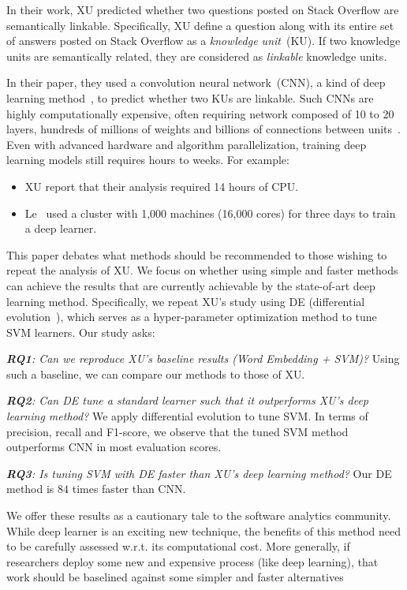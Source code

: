 \documentclass[sigconf]{acmart}
\theoremstyle{break}
\newcommand{\bi}{\begin{itemize}[leftmargin=0.4cm]}
\newcommand{\ei}{\end{itemize}}
\begin{document}
 In their work, XU predicted whether two questions posted on Stack Overflow are semantically linkable. 
Specifically, XU define a question along with its entire set of answers posted on Stack Overflow
as a {\it knowledge unit}~(KU). If two knowledge units are semantically related, they are considered
as {\it linkable} knowledge units. 

In their paper, they used a convolution neural
network~(CNN), a kind of deep learning method~\cite{lecun2015deep}, to predict whether two KUs are linkable. Such 
CNNs are highly computationally expensive,
often requiring network composed of 10 to 20 layers, hundreds of millions of weights and billions of connections between units~\cite{lecun2015deep}. Even with
advanced hardware and algorithm parallelization, training deep learning models still requires hours to weeks.
For example:
\bi
\item
XU report that their analysis
required 14 hours of CPU.
\item
Le~\cite{le2013building} used  a cluster with 1,000 machines (16,000 cores) for three days to train a deep learner.
\ei
 
This paper debates what methods should be recommended
to those wishing to repeat the analysis of XU. We focus on whether using simple and faster methods can achieve
the results that are currently achievable by the state-of-art deep learning method.
Specifically, we repeat XU's
study using  DE  (differential evolution~\cite{storn1997differential}),
which serves as a hyper-parameter optimization method to tune SVM learners.
Our study asks:


{\it \textbf{RQ1}: Can we reproduce XU's baseline results (Word Embedding + SVM)?}
Using such a baseline, we can compare our methods to those of XU.
 
 {\it \textbf{RQ2}: Can   DE   tune a standard learner such that
 it outperforms
  XU's deep learning method?}
 We apply differential evolution  to tune SVM. In terms of precision, recall and F1-score, we observe that the tuned SVM method outperforms CNN in most evaluation scores.

{\it \textbf{RQ3}: Is tuning SVM with DE faster than XU's deep learning method?}
Our   DE method
 is  $84$ times faster than CNN. 
 
We offer these results as a cautionary tale to the software analytics community.
While deep learner is an exciting new technique, the benefits of this
method need to be carefully assessed w.r.t. its computational cost. 
More generally,
if researchers deploy some new and expensive process (like deep learning), that work should be baselined against some simpler and faster alternatives
 
\end{document}

